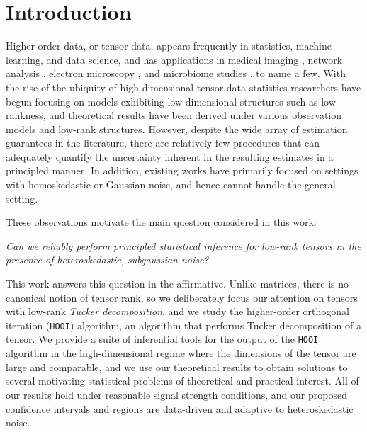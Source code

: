 \documentclass[10pt]{article}
\newcommand{\0}{{\mathbf{0}}}
\newcommand{\1}{{\mathbf{1}}}
\begin{document}

\tableofcontents
\section{Introduction}\label{sec:intro}
Higher-order data, or tensor data, appears frequently in statistics, machine learning, and data science, and has applications in medical imaging \citep{li_parsimonious_2017,zhang_tensor_2019}, network analysis \citep{jing_community_2021,lyu_latent_2023,lei_consistent_2020}, electron microscopy \citep{zhang_denoising_2020}, and microbiome studies \citep{martino_context-aware_2021,han2023guaranteed}, to name a few. With the rise of the ubiquity of high-dimensional tensor data statistics researchers have begun focusing on models exhibiting low-dimensional structures such as low-rankness, and theoretical results have been derived under various observation models and low-rank structures.  However, despite the wide array of estimation guarantees in the literature, there are relatively few procedures that can adequately quantify the uncertainty inherent in the resulting estimates in a principled manner.  In addition, existing works have primarily focused on settings with homoskedastic or Gaussian noise, and hence cannot handle the general setting. 

These observations motivate the main question considered in this work:
\begin{center}
    \textit{Can we reliably perform principled statistical inference for low-rank tensors in the presence of heteroskedastic, subgaussian noise?}
\end{center}
This work answers this question in the affirmative. Unlike matrices, there is no canonical notion of tensor rank, so we deliberately focus our attention on tensors with low-rank \emph{Tucker decomposition}, and we study the higher-order orthogonal iteration (\texttt{HOOI}) algorithm, an algorithm that performs Tucker decomposition of a tensor. We provide a suite of inferential tools for the output of the \texttt{HOOI} algorithm in the high-dimensional regime where the dimensions of the tensor are large and comparable, and we use our theoretical results to obtain solutions to several motivating statistical problems of theoretical and practical interest. All of our results hold under reasonable signal strength conditions, and our proposed confidence intervals and regions are data-driven and adaptive to heteroskedastic noise.  
\end{document}
